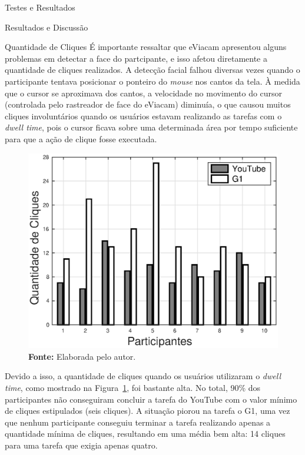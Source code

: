 \begin{chapter}{Testes e Resultados}
\begin{section}{Resultados e Discussão}
\begin{subsection}{Quantidade de Cliques}
É importante ressaltar que eViacam apresentou alguns problemas em detectar a
face do partcipante, e isso afetou diretamente a quantidade de cliques
realizados. A detecção facial falhou diversas vezes quando o participante
tentava posicionar o ponteiro do \textit{mouse} nos cantos da tela. À medida que
o cursor se aproximava dos cantos, a velocidade no movimento do cursor
(controlada pelo rastreador de face do eViacam) diminuía, o que causou muitos
cliques involuntários quando os usuários estavam realizando as tarefas com o
\textit{dwell time}, pois o cursor ficava sobre uma determinada área por tempo
suficiente para que a ação de clique fosse executada.

\begin{figure}[!h]
	\centering
	\includegraphics[width=.7\linewidth]{fig/DwellClicks}
	\caption{Quantidade de cliques de cada tarefa, utilizando o \textit{dwell time}.}
	\vspace{-1cm}
	\caption*{\textbf{Fonte: }Elaborada pelo autor.}
	\label{fig:dwellclicks}
\end{figure}

Devido a isso, a quantidade de cliques quando os usuários utilizaram o
\textit{dwell time}, como mostrado na Figura~\ref{fig:dwellclicks}, foi bastante
alta. No total, 90\% dos participantes não conseguiram concluir a tarefa do
YouTube com o valor mínimo de cliques estipulados (seis cliques). A situação
piorou na tarefa o G1, uma vez que nenhum participante conseguiu terminar a
tarefa realizando apenas a quantidade mínima de cliques, resultando em uma média 
bem alta: 14 cliques para uma tarefa que exigia apenas quatro.

~

~
  

\end{subsection}
\end{section}
\end{chapter}
